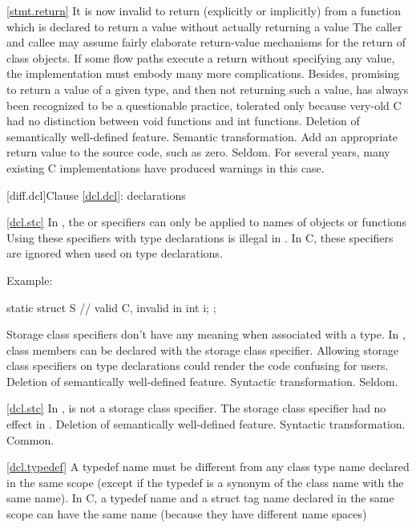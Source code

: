 \ref{stmt.return}
\change It is now invalid to return (explicitly or implicitly) from a function which is
declared to return a value without actually returning a value
\rationale
The caller and callee may assume fairly elaborate
return-value mechanisms for the return of class objects.
If
some flow paths execute a return without specifying any value,
the implementation must embody many more complications.
Besides,
promising to return a value of a given type, and then not returning
such a value, has always been recognized to be a questionable
practice, tolerated only because very-old C had no distinction between
void  functions and  int  functions.
\effect
Deletion of semantically well-defined feature.
\difficulty
Semantic transformation.
Add an appropriate return value to the source code, such as zero.
\howwide
Seldom.
For several years, many existing C implementations have produced warnings in
this case.

[diff.dcl]{Clause \ref{dcl.dcl}: declarations}

\ref{dcl.stc}
\change In \Cpp, the  or  specifiers can only be applied to names of objects or functions
Using these specifiers with type declarations is illegal in \Cpp.
In C, these specifiers are ignored when used on type declarations.

Example:

\begin{codeblock}
static struct S {               // valid C, invalid in \Cpp
  int i;
};
\end{codeblock}

\rationale
Storage class specifiers don't have any meaning when associated
with a type.
In \Cpp, class members can be declared with the  storage
class specifier.
Allowing storage class specifiers on type
declarations could render the code confusing for users.
\effect
Deletion of semantically well-defined feature.
\difficulty
Syntactic transformation.
\howwide
Seldom.

\ref{dcl.stc}
\change In \Cpp,  is not a storage class specifier.
\rationale
The storage class specifier had no effect in \Cpp.
\effect
Deletion of semantically well-defined feature.
\difficulty
Syntactic transformation.
\howwide
Common.

\ref{dcl.typedef}
\change A \Cpp typedef name must be different from any class type name declared
in the same scope (except if the typedef is a synonym of the class name with the
same name). In C, a typedef name and a struct tag name declared in the same scope
can have the same name (because they have different name spaces)

